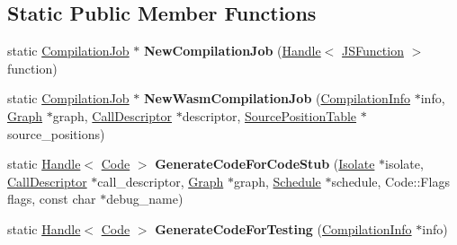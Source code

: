 \subsection*{Static Public Member Functions}
\begin{DoxyCompactItemize}
\item 
static \hyperlink{classv8_1_1internal_1_1_compilation_job}{Compilation\+Job} $\ast$ {\bfseries New\+Compilation\+Job} (\hyperlink{classv8_1_1internal_1_1_handle}{Handle}$<$ \hyperlink{classv8_1_1internal_1_1_j_s_function}{J\+S\+Function} $>$ function)\hypertarget{classv8_1_1internal_1_1compiler_1_1_pipeline_a883b42393863be282b7586909fd1ca9f}{}\label{classv8_1_1internal_1_1compiler_1_1_pipeline_a883b42393863be282b7586909fd1ca9f}

\item 
static \hyperlink{classv8_1_1internal_1_1_compilation_job}{Compilation\+Job} $\ast$ {\bfseries New\+Wasm\+Compilation\+Job} (\hyperlink{classv8_1_1internal_1_1_compilation_info}{Compilation\+Info} $\ast$info, \hyperlink{classv8_1_1internal_1_1compiler_1_1_graph}{Graph} $\ast$graph, \hyperlink{classv8_1_1internal_1_1compiler_1_1_call_descriptor}{Call\+Descriptor} $\ast$descriptor, \hyperlink{classv8_1_1internal_1_1compiler_1_1_source_position_table}{Source\+Position\+Table} $\ast$source\+\_\+positions)\hypertarget{classv8_1_1internal_1_1compiler_1_1_pipeline_acf2ba6dee1bf7e231ac2e35da487e4ad}{}\label{classv8_1_1internal_1_1compiler_1_1_pipeline_acf2ba6dee1bf7e231ac2e35da487e4ad}

\item 
static \hyperlink{classv8_1_1internal_1_1_handle}{Handle}$<$ \hyperlink{classv8_1_1internal_1_1_code}{Code} $>$ {\bfseries Generate\+Code\+For\+Code\+Stub} (\hyperlink{classv8_1_1internal_1_1_isolate}{Isolate} $\ast$isolate, \hyperlink{classv8_1_1internal_1_1compiler_1_1_call_descriptor}{Call\+Descriptor} $\ast$call\+\_\+descriptor, \hyperlink{classv8_1_1internal_1_1compiler_1_1_graph}{Graph} $\ast$graph, \hyperlink{classv8_1_1internal_1_1compiler_1_1_schedule}{Schedule} $\ast$schedule, Code\+::\+Flags flags, const char $\ast$debug\+\_\+name)\hypertarget{classv8_1_1internal_1_1compiler_1_1_pipeline_a364d3dc8bb929461be6d51257835726c}{}\label{classv8_1_1internal_1_1compiler_1_1_pipeline_a364d3dc8bb929461be6d51257835726c}

\item 
static \hyperlink{classv8_1_1internal_1_1_handle}{Handle}$<$ \hyperlink{classv8_1_1internal_1_1_code}{Code} $>$ {\bfseries Generate\+Code\+For\+Testing} (\hyperlink{classv8_1_1internal_1_1_compilation_info}{Compilation\+Info} $\ast$info)\hypertarget{classv8_1_1internal_1_1compiler_1_1_pipeline_a4439e48ed42773ee138ba7ff5c7c637a}{}\label{classv8_1_1internal_1_1compiler_1_1_pipeline_a4439e48ed42773ee138ba7ff5c7c637a}


\end{DoxyCompactItemize}
